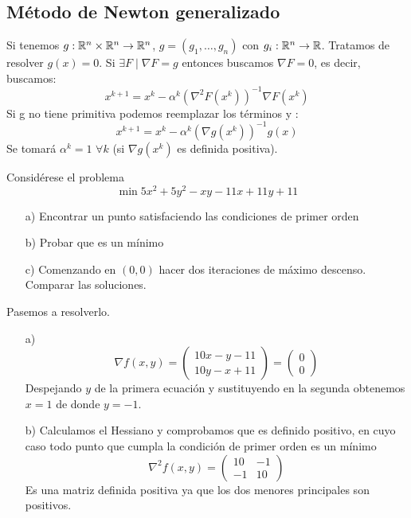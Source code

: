 \documentclass[PM.tex]{subfiles}
\begin{document}
\subsection{Método de Newton generalizado}
Si tenemos $g:\mathbb{R}^{n}\times\mathbb{R}^{ n}\to \mathbb{R}^n$, $g=(g_1,\dotsc,g_n)$ con $g_i : \mathbb{R}^n \to \mathbb{R}$. Tratamos de resolver $g(x)=0$. Si $\exists F\mid \nabla F = g$ entonces buscamos $\nabla F =0$, es decir, buscamos:
\[
x^{k+1} =x^k - \alpha^k (\nabla^2 F(x^k))^{-1}\nabla F(x^k)
\]
Si g no tiene primitiva podemos reemplazar los términos y :
\[
x^{k+1}=x^k-\alpha^k(\nabla g(x^k))^{-1} g(x)
\]
Se tomará $\alpha^k =1$ $\forall k$ (si $\nabla g(x^k)$ es definida positiva).
\begin{example}
Considérese el problema
\[ \min 5x^2+5y^2-xy-11x+11y+11 \]
\begin{itemize}
	\item[a)] Encontrar un punto satisfaciendo las condiciones de primer orden
	\item[b)] Probar que es un mínimo
	\item[c)] Comenzando en $(0,0)$ hacer dos iteraciones de máximo descenso. Comparar las soluciones.
\end{itemize}
Pasemos a resolverlo.
\begin{itemize}
	\item[a)] \[\nabla f(x,y) = \begin{pmatrix}
		10x-y-11\\
		10y-x+11
\end{pmatrix} = \begin{pmatrix}
	0\\
	0
\end{pmatrix} \]
Despejando $y$ de la primera ecuación y sustituyendo en la segunda obtenemos $x=1$ de donde $y=-1$.

	\item[b)] Calculamos el Hessiano y comprobamos que es definido positivo, en cuyo caso todo punto que cumpla la condición de primer orden es un mínimo
	\[ \nabla^2 f(x,y) = \begin{pmatrix}
		10 & -1\\
		-1 & 10
\end{pmatrix} \]
	Es una matriz definida positiva ya que los dos menores principales son positivos.
	

\end{itemize}
\end{example}
\end{document}
